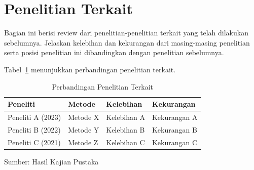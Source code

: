 \section{Penelitian Terkait}

Bagian ini berisi review dari penelitian-penelitian terkait yang telah dilakukan sebelumnya. Jelaskan kelebihan dan kekurangan dari masing-masing penelitian serta posisi penelitian ini dibandingkan dengan penelitian sebelumnya.

Tabel~\ref{tab:penelitian-terkait} menunjukkan perbandingan penelitian terkait.

\begin{table}[htbp]
    \caption{Perbandingan Penelitian Terkait}
    \label{tab:penelitian-terkait}
    \centering
    \begin{tabular}{|l|l|l|l|}
        \hline
        \textbf{Peneliti} & \textbf{Metode} & \textbf{Kelebihan} & \textbf{Kekurangan} \\
        \hline
        Peneliti A (2023) & Metode X & Kelebihan A & Kekurangan A \\
        \hline
        Peneliti B (2022) & Metode Y & Kelebihan B & Kekurangan B \\
        \hline
        Peneliti C (2021) & Metode Z & Kelebihan C & Kekurangan C \\
        \hline
    \end{tabular}
    
    \vspace{0.3cm}
    \footnotesize{Sumber: Hasil Kajian Pustaka}
\end{table}
